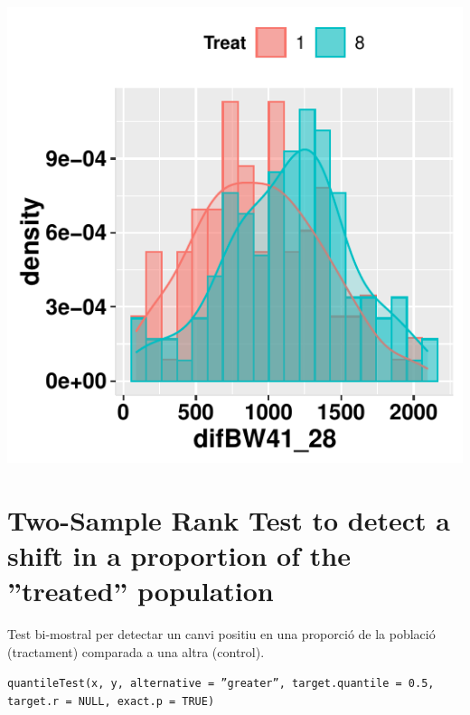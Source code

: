 \documentclass[11pt,a4paper]{article}\usepackage[]{graphicx}\usepackage[]{color}
\makeatletter
\def\maxwidth{ %
  \ifdim\Gin@nat@width>\linewidth
    \linewidth
  \else
    \Gin@nat@width
  \fi
}
\newenvironment{knitrout}{}{} %
\makeatother
\begin{document}
\begin{knitrout}
\color{fgcolor}
\includegraphics[width=\maxwidth]{figure/unnamed-chunk-14-1} 

\end{knitrout}



\clearpage
\section{Two-Sample Rank Test to detect a shift in a proportion of the ''treated'' population}



Test bi-mostral per detectar un canvi positiu en una proporció de la població (tractament) comparada a una altra (control).

\texttt{quantileTest(x, y, alternative = ''greater'', target.quantile = 0.5, target.r = NULL, exact.p = TRUE)}
    
\end{document}
